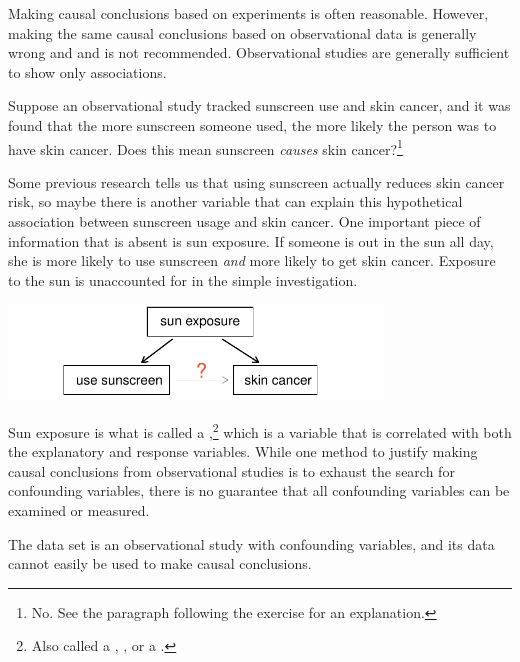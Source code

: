 \begin{doublespace}
Making causal conclusions based on experiments is often reasonable. However, making the same causal conclusions based on observational data is generally wrong and and is not recommended. Observational studies are generally sufficient to show only associations.


\begin{exercise} \label{sunscreenLurkingExample}
Suppose an observational study tracked sunscreen use and skin cancer, and it was found that the more sunscreen someone used, the more likely the person was to have skin cancer. Does this mean sunscreen \emph{causes} skin cancer?\footnote{No. See the paragraph following the exercise for an explanation.}
\end{exercise}

Some previous research tells us that using sunscreen actually reduces skin cancer risk, so maybe there is another variable that can explain this hypothetical association between sunscreen usage and skin cancer. One important piece of information that is absent is sun exposure. If someone is out in the sun all day, she is more likely to use sunscreen \emph{and} more likely to get skin cancer. Exposure to the sun is unaccounted for in the simple investigation.
\begin{center}
\includegraphics[height=1.0in]{ch_intro_to_data_oi_biostat/figures/variables/sunCausesCancer}
\end{center}

Sun exposure is what is called a ,\footnote{Also called a , , or a .} which is a variable that is correlated with both the explanatory and response variables. While one method to justify making causal conclusions from observational studies is to exhaust the search for confounding variables, there is no guarantee that all confounding variables can be examined or measured.

The  data set is an observational study with confounding variables, and its data cannot easily be used to make causal conclusions.


\end{doublespace}
